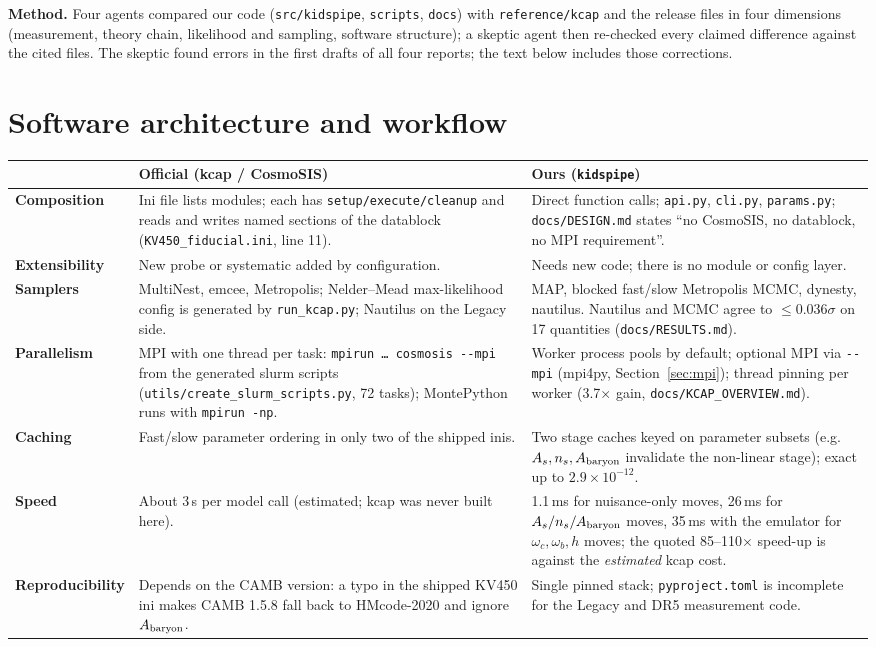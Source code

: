 \documentclass[10pt,a4paper]{article}
\newcommand{\file}[1]{{\small\texttt{#1}}}
\begin{document}
\textbf{Method.} Four agents compared our code (\file{src/kidspipe}, \file{scripts}, \file{docs}) with \file{reference/kcap} and the release files in four dimensions (measurement, theory chain, likelihood and sampling, software structure); a skeptic agent then re-checked every claimed difference against the cited files. The skeptic found errors in the first drafts of all four reports; the text below includes those corrections.

\section{Software architecture and workflow}
\begin{tabularx}{\textwidth}{@{}>{\bfseries}p{2.6cm}YY@{}}
\toprule
 & Official (kcap / CosmoSIS) & Ours (\texttt{kidspipe}) \\
\midrule
Composition & Ini file lists modules; each has \texttt{setup/execute/cleanup} and reads and writes named sections of the datablock (\file{KV450\_fiducial.ini}, line 11). & Direct function calls; \file{api.py}, \file{cli.py}, \file{params.py}; \file{docs/DESIGN.md} states ``no CosmoSIS, no datablock, no MPI requirement''. \\
Extensibility & New probe or systematic added by configuration. & Needs new code; there is no module or config layer. \\
Samplers & MultiNest, emcee, Metropolis; Nelder--Mead max-likelihood config is generated by \file{run\_kcap.py}; Nautilus on the Legacy side. & MAP, blocked fast/slow Metropolis MCMC, dynesty, nautilus. Nautilus and MCMC agree to $\le0.036\sigma$ on 17 quantities (\file{docs/RESULTS.md}). \\
Parallelism & MPI with one thread per task: \texttt{mpirun \dots\ cosmosis -{}-mpi} from the generated slurm scripts (\file{utils/\allowbreak create\_slurm\_\allowbreak scripts.py}, 72 tasks); MontePython runs with \texttt{mpirun -np}. & Worker process pools by default; optional MPI via \texttt{-{}-mpi} (mpi4py, Section~\ref{sec:mpi}); thread pinning per worker (3.7$\times$ gain, \file{docs/KCAP\_OVERVIEW.md}). \\
Caching & Fast/slow parameter ordering in only two of the shipped inis. & Two stage caches keyed on parameter subsets (e.g.\ $A_s,n_s,A_{\rm baryon}$ invalidate the non-linear stage); exact up to $2.9\times10^{-12}$. \\
Speed & About 3\,s per model call (estimated; kcap was never built here). & 1.1\,ms for nuisance-only moves, 26\,ms for $A_s/n_s/A_{\rm baryon}$ moves, 35\,ms with the emulator for $\omega_c,\omega_b,h$ moves; the quoted 85--110$\times$ speed-up is against the \emph{estimated} kcap cost. \\
Reproducibility & Depends on the CAMB version: a typo in the shipped KV450 ini makes CAMB 1.5.8 fall back to HMcode-2020 and ignore $A_{\rm baryon}$. & Single pinned stack; \file{pyproject.toml} is incomplete for the Legacy and DR5 measurement code. \\
\bottomrule
\end{tabularx}
\end{document}
